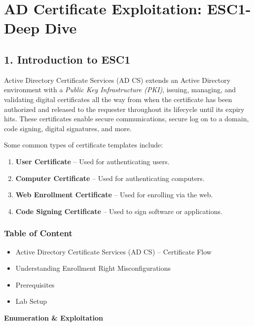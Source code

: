 
\section{AD Certificate Exploitation: ESC1-Deep Dive}

\subsection{1. Introduction to ESC1}
Active Directory Certificate Services (AD CS) extends an Active Directory environment with a \textit{Public Key Infrastructure (PKI)}, issuing, managing, and validating digital certificates all the way from when the certificate has been authorized and released to the requester throughout its lifecycle until its expiry hits. These certificates enable secure communications, secure log on to a domain, code signing, digital signatures, and more.


Some common types of certificate templates include:

\begin{enumerate}
    \item \textbf{User Certificate} – Used for authenticating users.
    \item \textbf{Computer Certificate} – Used for authenticating computers.
    \item \textbf{Web Enrollment Certificate} – Used for enrolling via the web.
    \item \textbf{Code Signing Certificate} – Used to sign software or applications.
\end{enumerate}

\subsubsection{Table of Content}

\begin{itemize}
    \item Active Directory Certificate Services (AD CS) – Certificate Flow
    \item Understanding Enrollment Right Misconfigurations
    \item Prerequisites
    \item Lab Setup
\end{itemize}
\textbf{Enumeration \& Exploitation}

